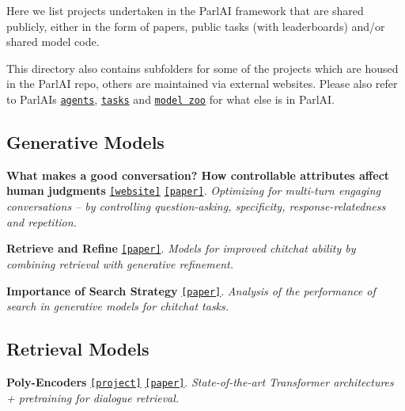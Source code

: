 Here we list projects undertaken in the Parl\+AI framework that are shared publicly, either in the form of papers, public tasks (with leaderboards) and/or shared model code.

This directory also contains subfolders for some of the projects which are housed in the Parl\+AI repo, others are maintained via external websites. Please also refer to Parl\+AI\textquotesingle{}s \href{https://github.com/facebookresearch/ParlAI/tree/master/parlai/tasks}{\tt agents}, \href{https://github.com/facebookresearch/ParlAI/tree/master/parlai/agents}{\tt tasks} and \href{https://github.com/facebookresearch/ParlAI/tree/master/parlai/zoo}{\tt model zoo} for what else is in Parl\+AI.

\subsection*{Generative Models}


\begin{DoxyItemize}
\item {\bfseries What makes a good conversation? How controllable attributes affect human judgments} \href{https://github.com/facebookresearch/ParlAI/tree/master/projects/controllable_dialogue}{\tt \mbox{[}website\mbox{]}} \href{https://arxiv.org/abs/1902.08654}{\tt \mbox{[}paper\mbox{]}}. {\itshape Optimizing for multi-\/turn engaging conversations -- by controlling question-\/asking, specificity, response-\/relatedness and repetition.}
\item {\bfseries Retrieve and Refine} \href{https://arxiv.org/abs/1808.04776}{\tt \mbox{[}paper\mbox{]}}. {\itshape Models for improved chitchat ability by combining retrieval with generative refinement.}
\item {\bfseries Importance of Search Strategy} \href{https://arxiv.org/abs/1811.00907}{\tt \mbox{[}paper\mbox{]}}. {\itshape Analysis of the performance of search in generative models for chitchat tasks.}
\end{DoxyItemize}

\subsection*{Retrieval Models}


\begin{DoxyItemize}
\item {\bfseries Poly-\/\+Encoders} \href{https://parl.ai/projects/polyencoder/}{\tt \mbox{[}project\mbox{]}} \href{https://arxiv.org/abs/1905.01969}{\tt \mbox{[}paper\mbox{]}}. {\itshape State-\/of-\/the-\/art Transformer architectures + pretraining for dialogue retrieval.}
\end{DoxyItemize}

